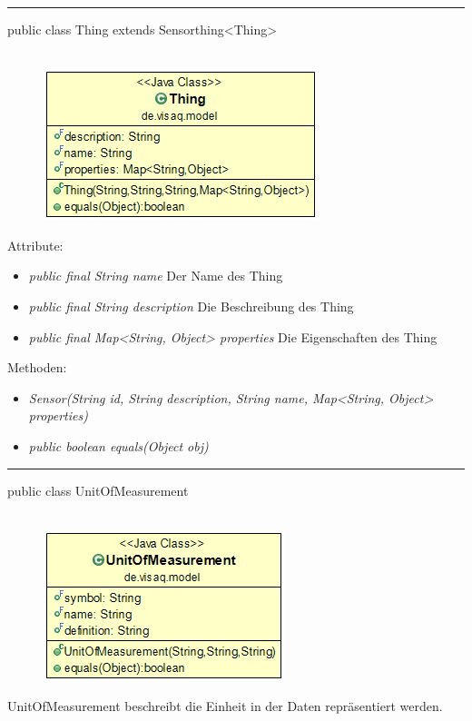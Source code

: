 \rule{\textwidth}{0.4pt}
public class Thing extends Sensorthing<Thing>
\\\\
\begin{minipage}{0.3\textwidth}
	\begin{figure}[H]
		\includegraphics[scale = 0.5
		]{media/frontend/model/ThingClass.png}
	\end{figure}
\end{minipage} \hfill
\begin{minipage}{0.6\textwidth}
\end{minipage}

Attribute:
\begin{itemize}
	\item \emph{public final String name} Der Name des Thing
	\item \emph{public final String description} Die Beschreibung des Thing
	\item \emph{public final Map<String, Object> properties} Die Eigenschaften des Thing
\end{itemize}
Methoden:
\begin{itemize}
	\item \emph{Sensor(String id, String description, String name, Map<String, Object> properties)} 
	\item \emph{public boolean equals(Object obj)} 
\end{itemize}

\rule{\textwidth}{0.4pt}
public class UnitOfMeasurement
\\\\
\begin{minipage}{0.3\textwidth}
	\begin{figure}[H]
		\includegraphics[scale = 0.5
		]{media/frontend/model/UnitOfMeasurementClass.png}
	\end{figure}
\end{minipage} \hfill
\begin{minipage}{0.6\textwidth}
	 UnitOfMeasurement beschreibt die Einheit in der Daten repräsentiert werden.
\end{minipage}


